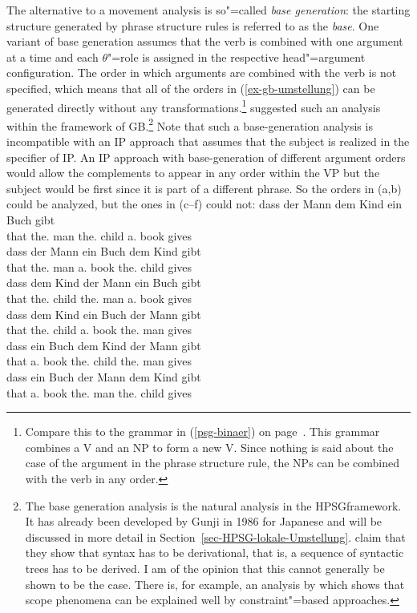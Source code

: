 The alternative to a movement analysis is so"=called \emph{base generation}: the starting structure generated by phrase structure
rules is referred to as the \emph{base}. One variant of base generation assumes that the verb is
combined with one argument at a time and each $\theta$"=role is assigned in the respective head"=argument configuration. The order in which
arguments are combined with the verb is not specified, which means that all of the orders in (\ref{ex-gb-umstellung}) can be
generated directly without any transformations.\footnote{%
 Compare this to the grammar in (\ref{psg-binaer}) on page~\pageref{psg-binaer}. This grammar
 combines a V and an NP to form a new V. Since nothing is said about the case of the argument in the
 phrase structure rule, the NPs can be combined with the verb in any order.
} \citet{Fanselow2001a} suggested such an analysis within the framework of GB.\footnote{%
	The base generation analysis is the natural analysis in the HPSG\indexhpsg framework. It has already been developed by Gunji\nocite{Gunji86a}
	in 1986 for Japanese and will be discussed in more detail in Section~\ref{sec-HPSG-lokale-Umstellung}. \citet[--314]{SE2002a}
	claim that they show that syntax has to be derivational, that is, a sequence of syntactic
        trees has to be derived. I am of the opinion that this cannot generally be shown to be the
        case. There is, for example, an analysis by \citet{Kiss2001a} which shows that scope
        phenomena can be explained well by constraint"=based approaches.
} Note that such a base-generation analysis is incompatible with an IP approach that assumes that
the subject is realized in the specifier of IP. An IP approach with base-generation of different
argument orders would allow the complements to appear in any order within the VP but the subject
would be first since it is part of a different phrase. So the orders in (a,b) could be
analyzed, but the ones in (c--f) could not:
\eal
\ex 
\gll dass der       Mann dem       Kind  ein Buch gibt\\
     that the.\nom{} man  the.\dat{} child a.\acc{} book gives\\
\ex
\gll dass der       Mann ein Buch dem       Kind gibt\\
     that the.\nom{} man  a.\acc{} book   the.\dat{} child gives\\
\ex
\gll dass dem       Kind  der Mann ein Buch gibt\\
     that the.\dat{} child the.\nom{} man a.\acc{} book gives\\
\ex 
\gll dass dem Kind ein Buch der Mann gibt\\
     that the.\dat{} child a.\acc{} book the.\nom{} man gives\\
\ex
\gll dass ein Buch dem Kind der Mann gibt\\
     that a.\acc{}   book the.\dat{} child the.\nom{} man gives\\
\ex
\gll dass ein Buch der Mann dem Kind gibt\\
     that a.\acc{}   book the.\nom{} man the.\dat{} child gives\\
\zl

